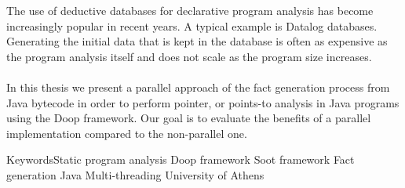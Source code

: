 \documentclass{dithesis}
\renewcommand{\university}{National and Kapodistrian University of Athens}
\renewcommand{\school}{School of Science}
\renewcommand{\department}{Department of Informatics and Telecommunications}
\renewcommand{\thesisplace}{Athens}
\renewcommand{\thesisdate}{July 2016}
\renewcommand{\thesislabel}{Undergraduate Thesis}
\renewcommand{\supervisorlabel}{Supervisors}
\renewcommand{\idlabel}{R.N.}
\begin{document}
\begin{otherlanguage}{english}
\maketitle
\setcounter{page}{3}
\end{otherlanguage}


\begin{otherlanguage}{greek}
\renewcommand{\university}{Εθνικό και Καποδιστριακό Πανεπιστήμιο Αθηνών}
\renewcommand{\school}{Σχολή Θετικών Επιστημών}
\renewcommand{\department}{Τμήμα Πληροφορικής και Τηλεπικοινωνιών}
\renewcommand{\thesisplace}{Αθήνα}
\renewcommand{\thesisdate}{Ιούλιος 2016}
\renewcommand{\thesislabel}{Πτυχιακή Εργασία}
\renewcommand{\supervisorlabel}{Επιβλέποντες}
\renewcommand{\idlabel}{Α.Μ.}
\let\thesupervisorslist\undefined
{}
\maketitlesecond
\end{otherlanguage}



\begin{thesisabstract}[ABSTRACT]
	The use of deductive databases for declarative program analysis has become increasingly popular in recent years. A typical example is Datalog databases. Generating the initial data that is kept in the database is often as expensive as the program analysis itself and does not scale as the program size increases.\\
	\\
    In this thesis we present a parallel approach of the fact generation process from Java bytecode in order to perform pointer, or points-to analysis in Java programs using the Doop framework. Our goal is to evaluate the benefits of a parallel implementation compared to the non-parallel one.

                {Keywords}{Static program analysis}
                            {Doop framework}
                            {Soot framework}
                            {Fact generation}
                            {Java Multi-threading}
                            {University of Athens}
\end{thesisabstract}
\end{document}
